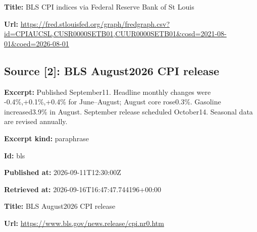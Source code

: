 \documentclass[11pt]{article}
\begin{document}
\par\noindent\textbf{Title:} BLS CPI indices via Federal Reserve Bank of St Louis

\par\noindent\textbf{Url:} \href{https://fred.stlouisfed.org/graph/fredgraph.csv?id=CPIAUCSL,CUSR0000SETB01,CUUR0000SETB01\&cosd=2021-08-01\&coed=2026-08-01}{https://fred\hspace{0pt}.stlouisfed.\hspace{0pt}org/graph/fr\hspace{0pt}edgraph.csv?\hspace{0pt}id=CPIAUCSL,\hspace{0pt}CUSR0000SETB\hspace{0pt}01,CUUR0000S\hspace{0pt}ETB01\&cosd=2\hspace{0pt}021-08-01\&co\hspace{0pt}ed=2026-08-0\hspace{0pt}1}

\subsection*{\textcolor{epdarkgreen}{Source [2]: BLS August2026 CPI release}}
\par\noindent\textbf{Excerpt:} Published September11. Headline monthly changes were -0.4\%,+0.1\%,+0.4\% for June–August; August core rose0.3\%. Gasoline increased3.9\% in August. September release scheduled October14. Seasonal data are revised annually.

\par\noindent\textbf{Excerpt kind:} paraphrase

\par\noindent\textbf{Id:} bls

\par\noindent\textbf{Published at:} 2026-09-11T12:30:00Z

\par\noindent\textbf{Retrieved at:} 2026-09-16T1\hspace{0pt}6:47:47.7441\hspace{0pt}96+00:00

\par\noindent\textbf{Title:} BLS August2026 CPI release

\par\noindent\textbf{Url:} \href{https://www.bls.gov/news.release/cpi.nr0.htm}{https://www.\hspace{0pt}bls.gov/news\hspace{0pt}.release/cpi\hspace{0pt}.nr0.htm}
\end{document}
